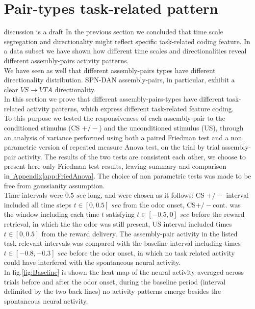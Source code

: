  \section{Pair-types task-related pattern}
 \label{sec:TaskResp}
 {\color{red}discussion is a draft}
In the previous section we concluded that time scale segregation and directionality might reflect specific task-related coding feature. In a data subset we have shown how different time scales and directionalities reveal different assembly-pairs activity patterns.\\We have seen as well that different assembly-pairs types have different directionality distribution. SPN-DAN assembly-pairs, in particular, exhibit a clear $VS\rightarrow VTA$ directionality.\\In this section we prove that different assembly-pairs-types have different task-related activity patterns, which express different task-related feature coding.\\
To this purpose we tested the responsiveness of each assembly-pair to the conditioned stimulus (CS $+/-$) and the unconditioned stimulus (US), through an analysis of variance performed using both a paired Friedman test and a non parametric version of repeated measure Anova test, on the trial by trial assembly-pair activity. The results of the two tests are consistent each other, we choose to present here only Friedman test results, leaving summary and comparison in\hyperref[app:FriedAnova]{~Appendix\ref*{app:FriedAnova}}. The choice of non parametric tests was made to be free from gaussianity assumption.\\Time intervals were 0.5 $sec$ long, and were chosen as it follows: CS $+/-$ interval included all time steps $t \in [0, 0.5]$ $sec$ from the odor onset, CS$+/-$cont. was the window including each time $t$ satisfying $t \in [-0.5, 0]$ $sec$ before the reward retrieval, in which the the odor was still present, US interval included times $t \in [0,0.5]$ from the reward delivery. The assembly-pair activity in the listed task relevant intervals was compared with the baseline interval including times $t \in [-0.8, -0.3]$ $sec$ before the odor onset, in which no task related activity could have interfered with the spontaneous neural activity.\\In fig.\ref{fig:Baseline} is shown the heat map of the neural activity averaged across trials before and after the odor onset, during the baseline period (interval delimited by the two back lines) no activity patterns emerge besides the spontaneous neural activity.\\
